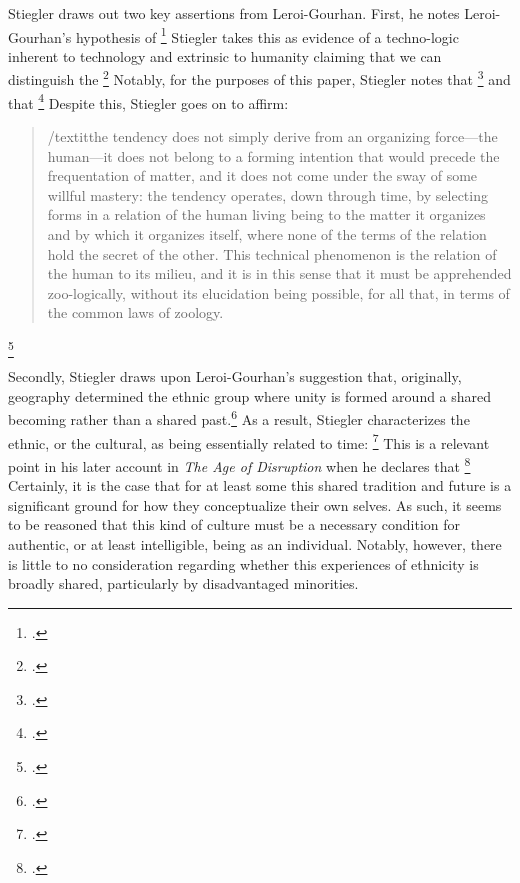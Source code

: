 \documentclass[letterpaper,notitlepage,12pt]{article}
\begin{document}
Stiegler draws out two key assertions from Leroi-Gourhan.
First, he notes Leroi-Gourhan's hypothesis of \footcite[p. 43]{stiegler_technics_1998}
Stiegler takes this as evidence of a techno-logic inherent to technology and
extrinsic to humanity claiming that we can distinguish the
\footcite[p. 44]{stiegler_technics_1998}
Notably, for the purposes of this paper, Stiegler notes that \footcite[p. 44]{stiegler_technics_1998} and that \footcite[p.
46]{stiegler_technics_1998}
Despite this, Stiegler goes on to affirm: \blockquote{/textit{the tendency does 
    not simply derive from an organizing force---the human---it does not belong 
    to a forming intention that would precede the frequentation of matter, and 
    it does not come under the sway of some willful mastery: the tendency 
    operates, down through time, by selecting forms in a relation of the human 
    living being to the matter it organizes and by which it organizes itself, 
  where none of the terms of the relation hold the secret of the other.} This 
    technical phenomenon is the relation of the human to its milieu, and it is 
    in this sense that it must be apprehended zoo-logically, without its 
    elucidation being possible, for all that, in terms of the common laws of
  zoology.}\footcite[p. 49]{stiegler_technics_1998}

Secondly, Stiegler draws upon Leroi-Gourhan's suggestion that, originally,
geography determined the ethnic group where unity is formed around a shared
becoming rather than a shared past.\footcite[p. 55--8]{stiegler_technics_1998}
As a result, Stiegler characterizes the ethnic, or the cultural, as being
essentially related to time: \footcite[p.
55]{stiegler_technics_1998}
This is a relevant point in his later account in \textit{The Age of Disruption}
when he declares that \footcite[ch.
2.7]{stiegler_age_2019}
Certainly, it is the case that for at least some this shared tradition and
future is a significant ground for how they conceptualize their own selves.
As such, it seems to be reasoned that this kind of culture must be a necessary
condition for authentic, or at least intelligible, being as an individual.
Notably, however, there is little to no consideration regarding whether this
experiences of ethnicity is broadly shared, particularly by disadvantaged
minorities.
\end{document}
